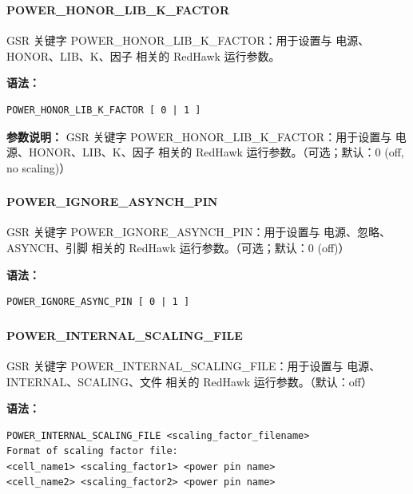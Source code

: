 \subsubsection{}
\paragraph*{POWER_HONOR_LIB_K_FACTOR}

GSR 关键字 POWER_HONOR_LIB_K_FACTOR：用于设置与 电源、HONOR、LIB、K、因子 相关的 RedHawk 运行参数。

\textbf{语法：}
\begin{lstlisting}
POWER_HONOR_LIB_K_FACTOR [ 0 | 1 ]
\end{lstlisting}

\textbf{参数说明：}
GSR 关键字 POWER\_HONOR\_LIB\_K\_FACTOR：用于设置与 电源、HONOR、LIB、K、因子 相关的 RedHawk 运行参数。（可选；默认：0 (off, no scaling)）

\subsubsection{}
\paragraph*{POWER_IGNORE_ASYNCH_PIN}

GSR 关键字 POWER_IGNORE_ASYNCH_PIN：用于设置与 电源、忽略、ASYNCH、引脚 相关的 RedHawk 运行参数。（可选；默认：0 (off)）

\textbf{语法：}
\begin{lstlisting}
POWER_IGNORE_ASYNC_PIN [ 0 | 1 ]
\end{lstlisting}

\subsubsection{}
\paragraph*{POWER_INTERNAL_SCALING_FILE}

GSR 关键字 POWER_INTERNAL_SCALING_FILE：用于设置与 电源、INTERNAL、SCALING、文件 相关的 RedHawk 运行参数。（默认：off）

\textbf{语法：}
\begin{lstlisting}
POWER_INTERNAL_SCALING_FILE <scaling_factor_filename>
Format of scaling factor file:
<cell_name1> <scaling_factor1> <power pin name>
<cell_name2> <scaling_factor2> <power pin name>
\end{lstlisting}

